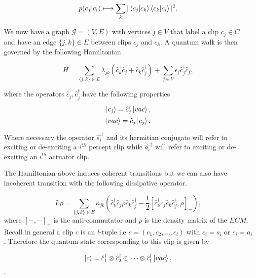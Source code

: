 \documentclass[twocolumn,prX,longbibliography]{revtex4}
\begin{document}
\begin{align}
 p(c_j|c_i) \longmapsto \sum_{k} \vert\braket{c_j|c_k}\braket{c_k|c_i}\vert^2 ,
\end{align}

We now have a graph \( \mathcal{G}=(V,E) \) with vertices
\(j\in V \) that label a clip \(c_j \in C\) and  have an edge \( \{j,k\} \in E \) between clips \(c_j \) and \(c_k\).
A quantum walk is then governed by the following Hamiltonian

\begin{equation}
 H = \sum_{\{j,k\}\in E} \lambda_{jk}\left( \hat{c}_k^{\dagger}\hat{c}_j + \hat{c}_k \hat{c}_j^{\dagger} \right) + \sum_{j\in V} \epsilon_j \hat{c}_j^{\dagger}\hat{c}_j,
\end{equation}

where the operators \(\hat{c}_j, \hat{c}_j^{\dagger}\) have the following properties
\begin{align}
 \ket{c_j} = \hat{c}_j^{\dagger}\ket{vac}, \\
 \ket{vac} = \hat{c}_j \ket{c_j},
\end{align}

Where necessary the operator \(\hat{s_i}^{\dagger} \) and its hermitian conjugate will refer to exciting or de-exciting a \(i^{th}\) percept clip while \(\hat{a_i}^{\dagger} \) will refer to exciting or de-exciting an \(i^{th}\) actuator clip.

The Hamiltonian above induces coherent transitions but we can also have incoherent transition with the following dissipative operator.


\begin{equation}
 L\rho = \sum_{\{j,k\}\in E} \kappa_{jk}\left(\hat{c}_k^{\dagger}\hat{c}_j \rho \hat{c}_k \hat{c}_j^{\dagger}- \frac{1}{2}[\hat{c}_k^{\dagger}\hat{c}_j\hat{c}_k\hat{c}_j^{\dagger},\rho]_{+} \right) ,
\end{equation}
where \([-,- ]_{+}\) is the anti-commutator and \( \rho \) is the density matrix of the \(ECM\). \newline
 Recall in general a clip \(c\) is an \(l\)-tuple i.e \(c= (c_1, c_2, \dots, c_l)\) with \(c_{i}=s_i \) or \(c_i = a_i\). Therefore the quantum state corresponding to this clip is given by
 
 \begin{equation}
  \ket{c} = \hat{c}^{\dagger}_1 \otimes \hat{c}^{\dagger}_2 \otimes \dots \otimes \hat{c}^{\dagger}_l \ket{vac}.
 \end{equation}.
 
\end{document}
